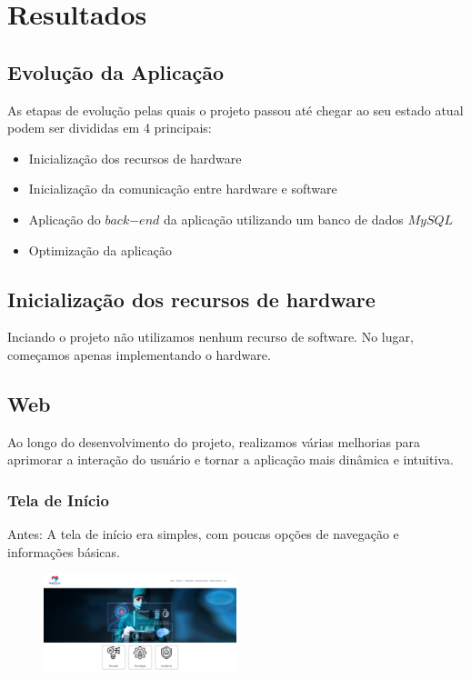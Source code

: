 \documentclass[conference, a4paper, 12pt]{IEEEtran}
\begin{document}
\section{Resultados}
\label{sec:results}
\subsection{Evolução da Aplicação}
As etapas de evolução pelas quais o projeto passou até chegar ao seu estado atual podem ser divididas em 4 principais:
\begin{itemize}
  \item Inicialização dos recursos de hardware
  \item Inicialização da comunicação entre hardware e software
  \item Aplicação do $back$$-$$end$ da aplicação utilizando um banco de dados $MySQL$
  \item Optimização da aplicação
\end{itemize}

\subsection{Inicialização dos recursos de hardware}
Inciando o projeto não utilizamos nenhum recurso de software. No lugar, começamos apenas implementando o hardware.

\subsection{Web}

Ao longo do desenvolvimento do projeto, realizamos várias melhorias para aprimorar a interação do usuário e tornar a aplicação mais dinâmica e intuitiva.

\subsubsection{Tela de Início}

Antes: A tela de início era simples, com poucas opções de navegação e informações básicas.
\begin{figure}[h]
  \begin{center}
    \includegraphics[width=0.5\textwidth]{home_antiga.png}
  \end{center}
\end{figure}
\end{document}
